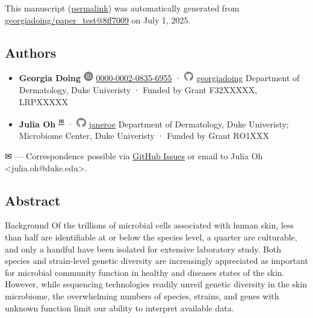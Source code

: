 This manuscript
(\href{https://georgiadoing.github.io/paper_test/v/8ff7009a71d5326cd42d445004039bee3ed30628/}{permalink})
was automatically generated
from \href{https://github.com/georgiadoing/paper_test/tree/8ff7009a71d5326cd42d445004039bee3ed30628}{georgiadoing/paper\_test@8ff7009}
on July 1, 2025.

\hypertarget{authors}{%
\subsection{Authors}\label{authors}}

\begin{itemize}
\item
  \textbf{Georgia Doing}
  \includegraphics[width=0.16667in,height=0.16667in]{images/orcid.svg}
  \href{https://orcid.org/0000-0002-0835-6955}{0000-0002-0835-6955}
  · \includegraphics[width=0.16667in,height=0.16667in]{images/github.svg}
  \href{https://github.com/georgiadoing}{georgiadoing}
  Department of Dermatology, Duke Univeristy
  · Funded by Grant F32XXXXX, LRPXXXXX
\item
  \textbf{Julia Oh}
  \textsuperscript{\protect\hyperlink{correspondence}{✉}}
  · \includegraphics[width=0.16667in,height=0.16667in]{images/github.svg}
  \href{https://github.com/janeroe}{janeroe}
  Department of Dermatology, Duke Univeristy; Microbiome Center, Duke Univeristy
  · Funded by Grant RO1XXX
\end{itemize}

\leavevmode{}%
✉ --- Correspondence possible via \href{https://github.com/georgiadoing/paper_test/issues}{GitHub Issues}
or email to
Julia Oh \textless julia.oh@duke.edu\textgreater.

\hypertarget{abstract}{%
\subsection{Abstract}\label{abstract}}

Background Of the trillions of microbial cells associated with human skin, less than half are identifiable at or below the species level, a quarter are culturable, and only a handful have been isolated for extensive laboratory study. Both species and strain-level genetic diversity are increasingly appreciated as important for microbial community function in healthy and diseases states of the skin. However, while sequencing technologies readily unveil genetic diversity in the skin microbiome, the overwhelming numbers of species, strains, and genes with unknown function limit our ability to interpret available data.


